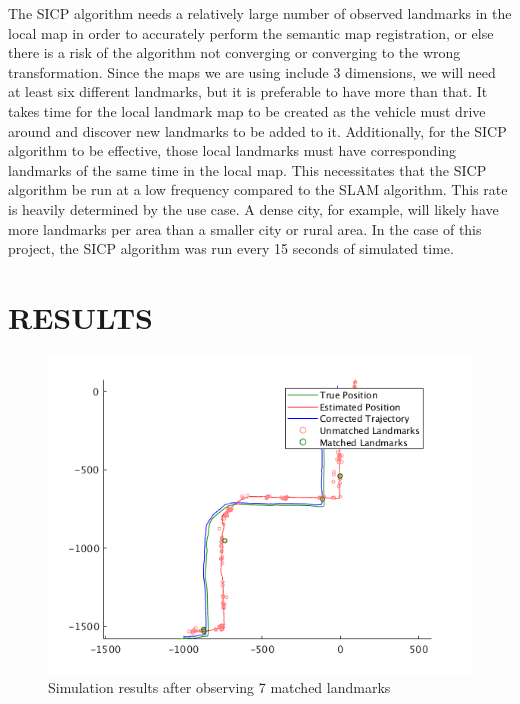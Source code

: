 \documentclass[letterpaper, 10 pt, conference]{ieeeconf}  %
\begin{document}
The SICP algorithm needs a relatively large number of observed landmarks in the local map in order to accurately perform the semantic map registration, or else there is a risk of the algorithm not converging or converging to the wrong transformation. Since the maps we are using include 3 dimensions, we will need at least six different landmarks, but it is preferable to have more than that. It takes time for the local landmark map to be created as the vehicle must drive around and discover new landmarks to be added to it. Additionally, for the SICP algorithm to be effective, those local landmarks must have corresponding landmarks of the same time in the local map. This necessitates that the SICP algorithm be run at a low frequency compared to the SLAM algorithm. This rate is heavily determined by the use case. A dense city, for example, will likely have more landmarks per area than a smaller city or rural area. In the case of this project, the SICP algorithm was run every 15 seconds of simulated time.


\section{RESULTS}

\begin{figure}[thpb]
  \centering
  \includegraphics[width=\linewidth]{sim_results.png}
  \caption{Simulation results after observing 7 matched landmarks}
  \label{fig:simresults}
\end{figure}
\end{document}
